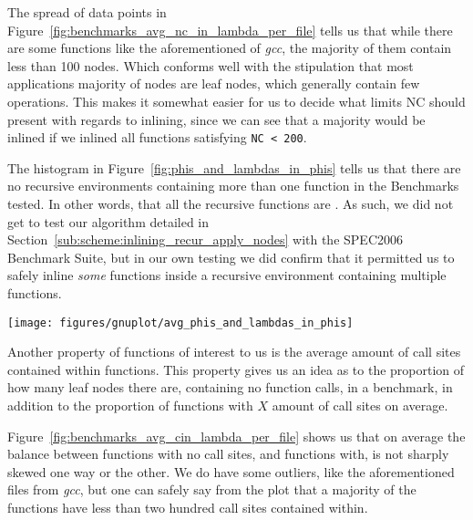 The spread of data points in
Figure~\ref{fig:benchmarks_avg_nc_in_lambda_per_file} tells us that while there
are some functions like the aforementioned of \textit{gcc}, the majority of them
contain less than 100 nodes. Which conforms well with the stipulation that most
applications majority of nodes are leaf nodes, which generally contain few
operations. This makes it somewhat easier for us to decide what limits NC should
present with regards to inlining, since we can see that a majority would be
inlined if we inlined all functions satisfying \lstinline|NC < 200|.

The histogram in Figure~\ref{fig:phis_and_lambdas_in_phis} tells us that there
are no recursive environments containing more than one function in the
Benchmarks tested. In other words, that all the recursive functions are
. As such, we did not get to test our algorithm
detailed in Section~\ref{sub:scheme:inlining_recur_apply_nodes} with the
SPEC2006 Benchmark Suite, but in our own testing we did confirm that it
permitted us to safely inline \textit{some} functions inside a recursive
environment containing multiple functions.

\begin{centering}
	\noindent\begin{minipage}{\textwidth}
		\captionsetup{type=figure}
		\hspace{-1em}
		\texttt{[image: figures/gnuplot/avg\_phis\_and\_lambdas\_in\_phis]}
	\end{minipage}
	\label{fig:phis_and_lambdas_in_phis}
\end{centering}

Another property of functions of interest to us is the average amount of call
sites contained within functions. This property gives us an idea as to the
proportion of how many leaf nodes there are, containing no function calls, in a
benchmark, in addition to the proportion of functions with $X$ amount of call
sites on average.

Figure~\ref{fig:benchmarks_avg_cin_lambda_per_file} shows us that on average the
balance between functions with no call sites, and functions with, is not sharply
skewed one way or the other. We do have some outliers, like the aforementioned
files from \textit{gcc}, but one can safely say from the plot that a majority of
the functions have less than two hundred call sites contained within.

